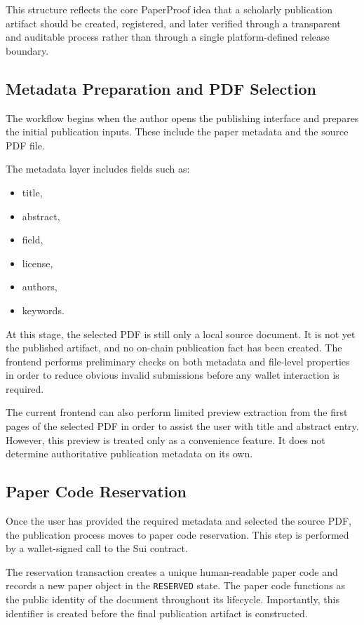 \documentclass[journal]{IEEEtran}
\begin{document}
This structure reflects the core PaperProof idea that a scholarly publication artifact should be created, registered, and later verified through a transparent and auditable process rather than through a single platform-defined release boundary.

\subsection{Metadata Preparation and PDF Selection}

The workflow begins when the author opens the publishing interface and prepares the initial publication inputs. These include the paper metadata and the source PDF file.

The metadata layer includes fields such as:
\begin{itemize}
    \item title,
    \item abstract,
    \item field,
    \item license,
    \item authors,
    \item keywords.
\end{itemize}


At this stage, the selected PDF is still only a local source document. It is not yet the published artifact, and no on-chain publication fact has been created. The frontend performs preliminary checks on both metadata and file-level properties in order to reduce obvious invalid submissions before any wallet interaction is required.

The current frontend can also perform limited preview extraction from the first pages of the selected PDF in order to assist the user with title and abstract entry. However, this preview is treated only as a convenience feature. It does not determine authoritative publication metadata on its own.

\subsection{Paper Code Reservation}

Once the user has provided the required metadata and selected the source PDF, the publication process moves to paper code reservation. This step is performed by a wallet-signed call to the Sui contract.

The reservation transaction creates a unique human-readable paper code and records a new paper object in the \texttt{RESERVED} state. The paper code functions as the public identity of the document throughout its lifecycle. Importantly, this identifier is created before the final publication artifact is constructed.
\end{document}
